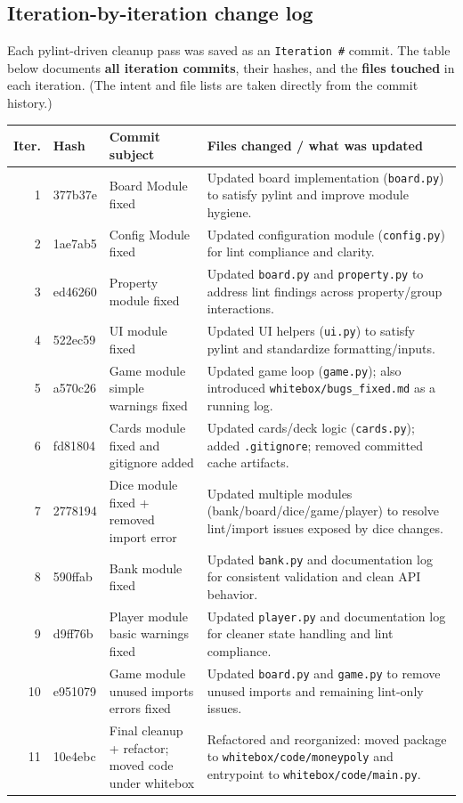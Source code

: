 \documentclass[11pt,a4paper]{article}
\begin{document}
\subsection{Iteration-by-iteration change log}
Each pylint-driven cleanup pass was saved as an \texttt{Iteration \#} commit. The table below documents \textbf{all iteration commits}, their hashes, and the \textbf{files touched} in each iteration. (The intent and file lists are taken directly from the commit history.)

\begin{longtable}{@{}r p{} p{} >{\raggedright\arraybackslash}p{}@{}}
\toprule
\textbf{Iter.} & \textbf{Hash} & \textbf{Commit subject} & \textbf{Files changed / what was updated} \\
\midrule
\endhead
1  & 377b37e & Board Module fixed & Updated board implementation (\texttt{board.py}) to satisfy pylint and improve module hygiene. \\
2  & 1ae7ab5 & Config Module fixed & Updated configuration module (\texttt{config.py}) for lint compliance and clarity. \\
3  & ed46260 & Property module fixed & Updated \texttt{board.py} and \texttt{property.py} to address lint findings across property/group interactions. \\
4  & 522ec59 & UI module fixed & Updated UI helpers (\texttt{ui.py}) to satisfy pylint and standardize formatting/inputs. \\
5  & a570c26 & Game module simple warnings fixed & Updated game loop (\texttt{game.py}); also introduced \texttt{whitebox/bugs\_fixed.md} as a running log. \\
6  & fd81804 & Cards module fixed and gitignore added & Updated cards/deck logic (\texttt{cards.py}); added \texttt{.gitignore}; removed committed cache artifacts. \\
7  & 2778194 & Dice module fixed + removed import error & Updated multiple modules (bank/board/dice/game/player) to resolve lint/import issues exposed by dice changes. \\
8  & 590ffab & Bank module fixed & Updated \texttt{bank.py} and documentation log for consistent validation and clean API behavior. \\
9  & d9ff76b & Player module basic warnings fixed & Updated \texttt{player.py} and documentation log for cleaner state handling and lint compliance. \\
10 & e951079 & Game module unused imports errors fixed & Updated \texttt{board.py} and \texttt{game.py} to remove unused imports and remaining lint-only issues. \\
11 & 10e4ebc & Final cleanup + refactor; moved code under whitebox & Refactored and reorganized: moved package to \texttt{whitebox/code/moneypoly} and entrypoint to \texttt{whitebox/code/main.py}. \\
\bottomrule
\end{longtable}
\end{document}
